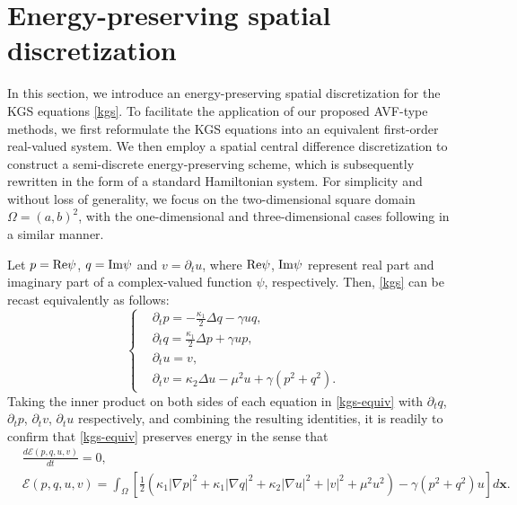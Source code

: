 \documentclass[fleqn,11pt]{elsarticle}
\numberwithin{equation}{section}
\begin{document}
\section{Energy-preserving spatial discretization}\label{sec:2}
In this section, we introduce an energy-preserving spatial discretization for the KGS equations \eqref{kgs}. To facilitate the application of our proposed AVF-type methods, we first reformulate the KGS equations into an equivalent first-order real-valued system. We then employ a spatial central difference discretization to construct a semi-discrete energy-preserving scheme, which is subsequently rewritten in the form of a standard Hamiltonian system. For simplicity and without loss of generality, we focus on the two-dimensional square domain $\Omega = (a, b)^2$, with the one-dimensional and three-dimensional cases following in a similar manner.



Let $p = {\rm Re} \psi$, $q = {\rm Im} \psi$ and $v = \partial_t u$, where ${\rm Re} \psi$, ${\rm Im} \psi$ represent real part and imaginary part of a complex-valued function $\psi$, respectively. Then, \eqref{kgs} can be recast equivalently as follows:
\begin{equation}\label{kgs-equiv}
	\left\lbrace
	\begin{aligned}
		 & \partial_t p = - \frac{\kappa_1}{2} \Delta q - \gamma u q,      \\
		 & \partial_t q =  \frac{\kappa_1}{2} \Delta p + \gamma u p,       \\
		 & \partial_t u = v,                                               \\
		 & \partial_t v = \kappa_2 \Delta u - \mu^2 u + \gamma(p^2 + q^2).
	\end{aligned}
	\right.
\end{equation}
Taking the inner product on both sides of each equation in \eqref{kgs-equiv} with $\partial_t q$, $\partial_t p$, $\partial_t v$, $\partial_t u$ respectively, and combining the resulting identities, it is readily to confirm that \eqref{kgs-equiv} preserves energy in the sense that
\begin{equation*}
	\begin{aligned}
		 & \frac{d\mathcal{E}(p, q, u, v)}{dt} = 0, \quad                                                                                                                                           \\
		 & \mathcal{E}(p, q, u, v) = \int_\Omega \left[\frac{1}{2} \left(\kappa_1 |\nabla p|^2 + \kappa_1 |\nabla q|^2 + \kappa_2 |\nabla u|^2 + |v|^2 + \mu^2 u^2\right) - \gamma (p^2 + q^2) u \right] d\bm{x}.
	\end{aligned}
\end{equation*}
\end{document}
